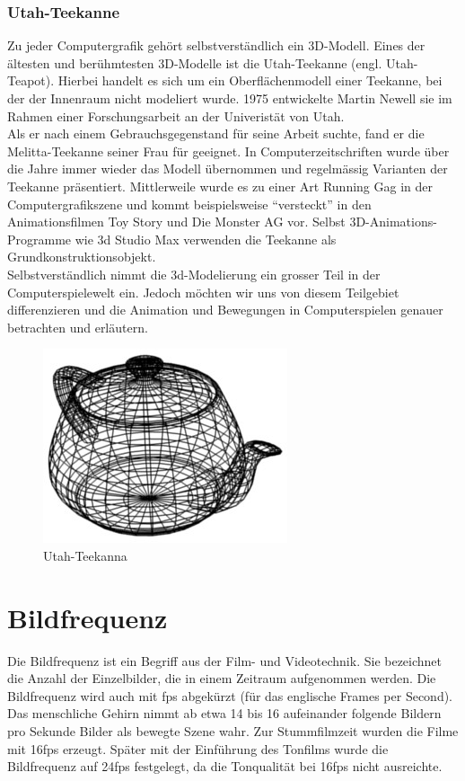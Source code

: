 \subsubsection{Utah-Teekanne}

Zu jeder Computergrafik gehört selbstverständlich ein 3D-Modell. Eines der ältesten und berühmtesten 3D-Modelle ist die Utah-Teekanne (engl. Utah-Teapot). Hierbei handelt es sich um ein Oberflächenmodell einer Teekanne, bei der der Innenraum nicht modeliert wurde. 1975 entwickelte Martin Newell sie im Rahmen einer Forschungsarbeit an der Univeristät von Utah. \\
Als er nach einem Gebrauchsgegenstand für seine Arbeit suchte, fand er die Melitta-Teekanne seiner Frau für geeignet. In Computerzeitschriften wurde über die Jahre immer wieder das Modell übernommen und regelmässig Varianten der Teekanne präsentiert. Mittlerweile wurde es zu einer Art Running Gag in der Computergrafikszene und kommt beispielsweise ``versteckt'' in den Animationsfilmen Toy Story und Die Monster AG vor. Selbst 3D-Animations-Programme wie 3d Studio Max verwenden die Teekanne als Grundkonstruktionsobjekt. \\ 
Selbstverständlich nimmt die 3d-Modelierung ein grosser Teil in der Computerspielewelt ein. Jedoch möchten wir uns von diesem Teilgebiet differenzieren und die Animation und Bewegungen in Computerspielen genauer betrachten und erläutern.

\begin{figure}[htbp]
\center
\includegraphics[scale=0.5]{include/teapot.png}
\caption{Utah-Teekanna}
\end{figure}

\section{Bildfrequenz}
Die Bildfrequenz ist ein Begriff aus der Film- und Videotechnik. Sie bezeichnet die Anzahl der Einzelbilder, die in einem Zeitraum aufgenommen werden. Die Bildfrequenz wird auch mit fps abgekürzt (für das englische Frames per Second).\\
Das menschliche Gehirn nimmt ab etwa 14 bis 16 aufeinander folgende Bildern pro Sekunde Bilder als bewegte Szene wahr.
Zur Stummfilmzeit wurden die Filme mit 16fps erzeugt. Später mit der Einführung des Tonfilms wurde die Bildfrequenz auf 24fps festgelegt, da die Tonqualität bei 16fps nicht ausreichte.

